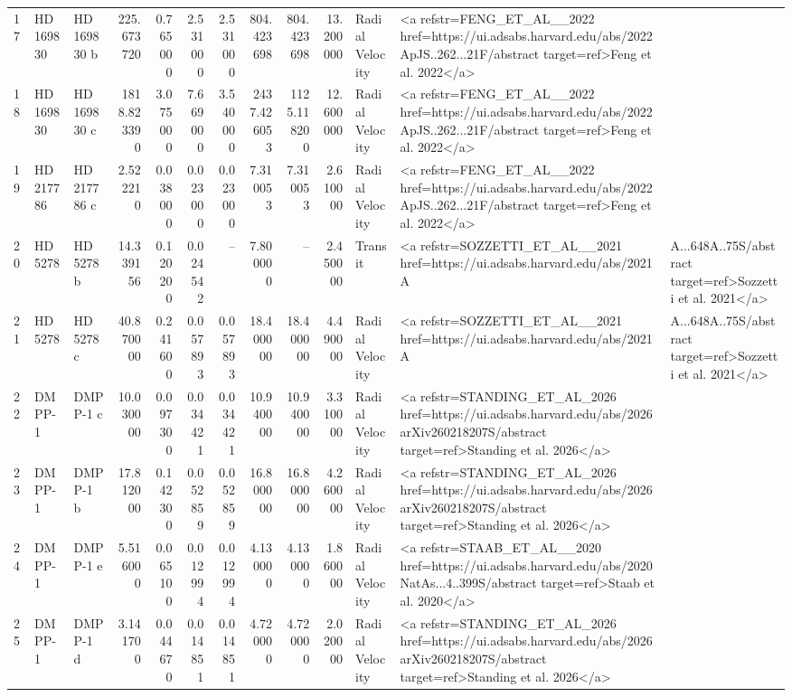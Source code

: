 \begin{tabular}{lllrrrrrrrll}
17 & HD 169830 & HD 169830 b & 225.673720 & 0.765000 & 2.531000 & 2.531000 & 804.423698 & 804.423698 & 13.200000 & Radial Velocity & <a refstr=FENG_ET_AL__2022 href=https://ui.adsabs.harvard.edu/abs/2022ApJS..262...21F/abstract target=ref>Feng et al. 2022</a> \\
18 & HD 169830 & HD 169830 c & 1818.823390 & 3.075000 & 7.669000 & 3.540000 & 2437.426053 & 1125.118200 & 12.600000 & Radial Velocity & <a refstr=FENG_ET_AL__2022 href=https://ui.adsabs.harvard.edu/abs/2022ApJS..262...21F/abstract target=ref>Feng et al. 2022</a> \\
19 & HD 217786 & HD 217786 c & 2.522210 & 0.038000 & 0.023000 & 0.023000 & 7.310053 & 7.310053 & 2.610000 & Radial Velocity & <a refstr=FENG_ET_AL__2022 href=https://ui.adsabs.harvard.edu/abs/2022ApJS..262...21F/abstract target=ref>Feng et al. 2022</a> \\
20 & HD 5278 & HD 5278 b & 14.339156 & 0.120200 & 0.024542 & -- & 7.800000 & -- & 2.450000 & Transit & <a refstr=SOZZETTI_ET_AL__2021 href=https://ui.adsabs.harvard.edu/abs/2021A&A...648A..75S/abstract target=ref>Sozzetti et al. 2021</a> \\
21 & HD 5278 & HD 5278 c & 40.870000 & 0.241600 & 0.057893 & 0.057893 & 18.400000 & 18.400000 & 4.490000 & Radial Velocity & <a refstr=SOZZETTI_ET_AL__2021 href=https://ui.adsabs.harvard.edu/abs/2021A&A...648A..75S/abstract target=ref>Sozzetti et al. 2021</a> \\
22 & DMPP-1 & DMPP-1 c & 10.030000 & 0.097300 & 0.034421 & 0.034421 & 10.940000 & 10.940000 & 3.310000 & Radial Velocity & <a refstr=STANDING_ET_AL_2026 href=https://ui.adsabs.harvard.edu/abs/2026arXiv260218207S/abstract target=ref>Standing et al. 2026</a> \\
23 & DMPP-1 & DMPP-1 b & 17.812000 & 0.142300 & 0.052859 & 0.052859 & 16.800000 & 16.800000 & 4.260000 & Radial Velocity & <a refstr=STANDING_ET_AL_2026 href=https://ui.adsabs.harvard.edu/abs/2026arXiv260218207S/abstract target=ref>Standing et al. 2026</a> \\
24 & DMPP-1 & DMPP-1 e & 5.516000 & 0.065100 & 0.012994 & 0.012994 & 4.130000 & 4.130000 & 1.860000 & Radial Velocity & <a refstr=STAAB_ET_AL__2020 href=https://ui.adsabs.harvard.edu/abs/2020NatAs...4..399S/abstract target=ref>Staab et al. 2020</a> \\
25 & DMPP-1 & DMPP-1 d & 3.141700 & 0.044670 & 0.014851 & 0.014851 & 4.720000 & 4.720000 & 2.020000 & Radial Velocity & <a refstr=STANDING_ET_AL_2026 href=https://ui.adsabs.harvard.edu/abs/2026arXiv260218207S/abstract target=ref>Standing et al. 2026</a> \\

\end{tabular}
